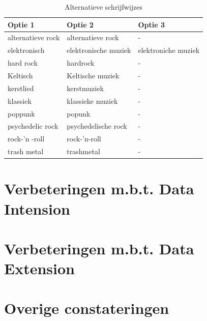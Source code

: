 \documentclass{report}
\begin{document}
                \begin{table}[h!]
                    \centering
                    \begin{tabular}{|l|l|l|}
                    \hline
                    \textbf{Optie 1} & \textbf{Optie 2} & \textbf{Optie 3} \\ \hline
                    alternatieve rock & alternatieve rock & - \\ \hline
                    elektronisch & elektronische muziek & elektroniche muziek \\ \hline
                    hard rock & hardrock & - \\ \hline
                    Keltisch & Keltische muziek & - \\ \hline
                    kerstlied & kerstmuziek & - \\ \hline
                    klassiek & klassieke muziek & - \\ \hline
                    poppunk & popunk & - \\ \hline
                    psychedelic rock & psychedelische rock & - \\ \hline
                    rock-'n -roll & rock-'n-roll & - \\ \hline
                    trash metal & trashmetal & - \\ \hline
                    \end{tabular}
                    \caption{Alternatieve schrijfwijzes}
                \end{table}
                

        \section{Verbeteringen m.b.t. Data Intension}


        \section{Verbeteringen m.b.t. Data Extension}


        \section{Overige constateringen}
\end{document}
